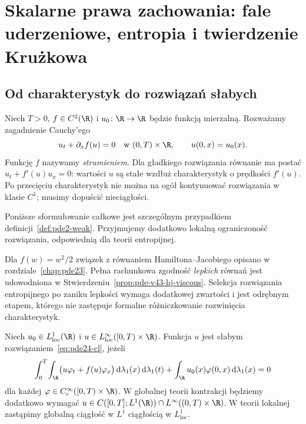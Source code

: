 \chapter[Skalarne prawa zachowania]{Skalarne prawa zachowania: fale uderzeniowe, entropia i twierdzenie Krużkowa}
\label{chap:pde24}

\section{Od charakterystyk do rozwiązań słabych}
Niech $T>0$, $f\in C^2(\R)$ i $u_0\colon\R\to\R$ będzie
funkcją mierzalną. Rozważamy zagadnienie Cauchy'ego
\begin{equation}\label{eq:pde24-cl}
 u_t+\partial_x f(u)=0\quad\text{w }(0,T)\times\R,
 \qquad u(0,x)=u_0(x).
\end{equation}
Funkcję $f$ nazywamy \emph{strumieniem}. Dla gładkiego rozwiązania
równanie ma postać $u_t+f'(u)u_x=0$: wartości $u$ są stałe
wzdłuż charakterystyk o prędkości $f'(u)$. Po przecięciu
charakterystyk nie można na ogół kontynuować rozwiązania
w klasie $C^1$; musimy dopuścić nieciągłości.

Poniższe sformułowanie całkowe jest szczególnym
przypadkiem definicji~\ref{def:pde2-weak}.
Przyjmujemy dodatkowo lokalną ograniczoność rozwiązania,
odpowiednią dla teorii entropijnej.

\begin{uwaga}
\label{rem:pde-v43-hj-entropy-bridge}
Dla $f(w)=w^2/2$ związek z równaniem
Hamiltona--Jacobiego opisano w
rozdziale~\ref{chap:pde23}. Pełna rachunkowa zgodność
\emph{lepkich} równań jest udowodniona w
Stwierdzeniu~\ref{prop:pde-v43-hj-viscous}.
Selekcja rozwiązania entropijnego po zaniku lepkości
wymaga dodatkowej zwartości i jest odrębnym etapem,
którego nie zastępuje formalne różniczkowanie
rozwinięcia charakterystyk.
\end{uwaga}

\begin{definicja}
Niech $u_0\in L^1_{\mathrm{loc}}(\R)$ i
$u\in L^\infty_{\mathrm{loc}}([0,T)\times\R)$.
Funkcja $u$ jest słabym rozwiązaniem~\eqref{eq:pde24-cl}, jeżeli
\begin{equation}\label{eq:pde24-weak}
 \int_0^T\!\int_\R
  \bigl(u\varphi_t+f(u)\varphi_x\bigr)\,\mathrm d\lambda_1(x)\,\mathrm d\lambda_1(t)
 +\int_\R u_0(x)\varphi(0,x)\,\mathrm d\lambda_1(x)=0
\end{equation}
dla każdej $\varphi\in C_c^\infty([0,T)\times\R)$.
W globalnej teorii kontrakcji będziemy dodatkowo wymagać
$u\in C([0,T];L^1(\R))\cap L^\infty((0,T)\times\R)$.
W teorii lokalnej zastąpimy globalną ciągłość w $L^1$
ciągłością w $L^1_{\mathrm{loc}}$.
\end{definicja}

